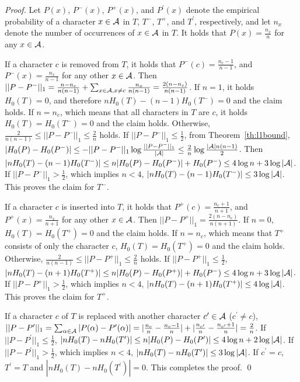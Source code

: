 \documentclass{llncs}
\begin{document}
\begin{proof}
Let $P(x)$, $P^-(x)$, $P^+(x)$, and $P^\prime(x)$ denote the empirical probability of a character $x \in {\cal A}$
in $T$, $T^-$, $T^+$, and $T^\prime$, respectively, and let $n_x$ denote the number of occurrences of $x \in {\cal A}$ in $T$.
It holds that $P(x) = \frac{n_x}{n}$ for any $x \in {\cal A}$.

If a character $c$ is removed from $T$, it holds that
$P^-(c) = \frac{n_c-1}{n-1}$, and $P^-(x) = \frac{n_x}{n-1}$
for any other $x \in {\cal A}$.  Then 
$||P - P^-||_1 = \frac{n-n_c}{n (n-1)}+ \sum_{x \in {\cal A}, x \neq c} \frac{n_x}{n (n-1)} = \frac{2(n-n_c)}{n (n-1)}$.
If $n = 1$, it holds $H_0(T) = 0$, and therefore $nH_0(T) - (n-1)H_0(T^-) = 0$ and the claim holds.
If $n = n_c$, which means that all characters in $T$ are $c$, it holds $H_0(T) = H_0(T^-) = 0$ and the claim holds.
Otherwise, $\frac{2}{n(n-1)} \le ||P - P^-||_1 \le \frac{2}{n}$ holds.
If $||P - P^-||_1 \le \frac{1}{2}$, from Theorem~\ref{th:l1bound}, 
$| H_0(P) - H_0(P^-) | \le - ||P - P^-||_1 \log \frac{||P - P^-||_1}{|{\cal A}|}
\le \frac{2}{n} \log \frac{|{\cal A}|n(n-1)}{2}$.
Then $|n H_0(T) - (n-1)H_0(T^-)| \le n | H_0(P) - H_0(P^-) | + H_0(P^-) \le 4 \log n + 3 \log |{\cal A}|$.
If $||P - P^-||_1 > \frac{1}{2}$, which implies $n < 4$, $|n H_0(T) - (n-1)H_0(T^-)| \le 3 \log |{\cal A}|$.
This proves the claim for $T^-$.

If a character $c$ is inserted into $T$, it holds that
$P^+(c) = \frac{n_c+1}{n+1}$, and $P^+(x) = \frac{n_x}{n+1}$
for any other $x \in {\cal A}$.  Then $||P - P^+||_1 = \frac{2(n-n_c)}{n (n+1)}$.
If $n = 0$, $H_0(T) = H_0(T^+) = 0$ and the claim holds.
If $n = n_c$, which means that $T^+$ consists of only the character $c$, $H_0(T) = H_0(T^+) = 0$ and the claim holds.
Otherwise, $\frac{2}{n(n-1)} \le ||P - P^+||_1 \le \frac{2}{n}$ holds.
If $||P - P^+||_1 \le \frac{1}{2}$, $|n H_0(T) - (n+1)H_0(T^+)| \le n | H_0(P) - H_0(P^+) | + H_0(P^-) \le 4 \log n + 3 \log |{\cal A}|$.
If $||P - P^+||_1 > \frac{1}{2}$, which implies $n < 4$, $|n H_0(T) - (n+1)H_0(T^+)| \le 4 \log |{\cal A}|$.
This proves the claim for $T^+$.

If a character $c$ of $T$ is replaced with another character $c^\prime \in {\cal A}$ ($c^\prime \neq c$),
$||P - P^\prime||_1 = \sum_{\alpha \in {\cal A}}
|P(\alpha) -  P^\prime(\alpha)| = |\frac{n_c}{n} - \frac{n_c-1}{n}|
+ |\frac{n_{c^\prime}}{n} - \frac{n_{c^\prime}+1}{n}| = \frac{2}{n}$.
If $||P - P^\prime||_1 \le \frac{1}{2}$,
$|n H_0(T) - nH_0(T^\prime)| \le n | H_0(P) - H_0(P^\prime) | \le 4 \log n + 2 \log |{\cal A}|$.
If $||P - P^\prime||_1 > \frac{1}{2}$, which implies $n < 4$, 
$|n H_0(T) - nH_0(T^\prime)| \le 3 \log |{\cal A}|$.
If $c^\prime = c$, $T^\prime = T$ and $|n H_0(T) - nH_0(T^\prime)| = 0$.
This completes the proof.
\qed
\end{proof}
\end{document}
